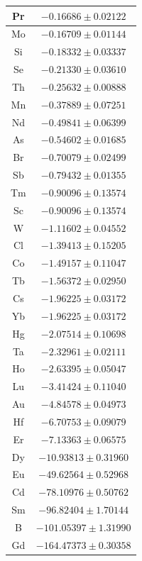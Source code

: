 \documentclass[11pt]{article}
\begin{document}
\begin{table}[ht]
\begin{tabular}{| c | c |}
    Pr                &   $-0.16686\pm0.02122$ \\ \hline
    Mo                &   $-0.16709\pm0.01144$ \\ \hline
    Si                &   $-0.18332\pm0.03337$ \\ \hline
    Se                &   $-0.21330\pm0.03610$ \\ \hline
    Th                &   $-0.25632\pm0.00888$ \\ \hline
    Mn                &   $-0.37889\pm0.07251$ \\ \hline
    Nd                &   $-0.49841\pm0.06399$ \\ \hline
    As                &   $-0.54602\pm0.01685$ \\ \hline
    Br                &   $-0.70079\pm0.02499$ \\ \hline
    Sb                &   $-0.79432\pm0.01355$ \\ \hline
    Tm                &   $-0.90096\pm0.13574$ \\ \hline
    Sc                &   $-0.90096\pm0.13574$ \\ \hline
    W                 &   $-1.11602\pm0.04552$ \\ \hline
    Cl                &   $-1.39413\pm0.15205$ \\ \hline
    Co                &   $-1.49157\pm0.11047$ \\ \hline
    Tb                &   $-1.56372\pm0.02950$ \\ \hline
    Cs                &   $-1.96225\pm0.03172$ \\ \hline
    Yb                &   $-1.96225\pm0.03172$ \\ \hline
    Hg                &   $-2.07514\pm0.10698$ \\ \hline
    Ta                &   $-2.32961\pm0.02111$ \\ \hline
    Ho                &   $-2.63395\pm0.05047$ \\ \hline
    Lu                &   $-3.41424\pm0.11040$ \\ \hline
    Au                &   $-4.84578\pm0.04973$ \\ \hline
    Hf                &   $-6.70753\pm0.09079$ \\ \hline
    Er                &   $-7.13363\pm0.06575$ \\ \hline
    Dy                &  $-10.93813\pm0.31960$ \\ \hline
    Eu                &  $-49.62564\pm0.52968$ \\ \hline
    Cd                &  $-78.10976\pm0.50762$ \\ \hline
    Sm                &  $-96.82404\pm1.70144$ \\ \hline
    B                 & $-101.05397\pm1.31990$ \\ \hline
    Gd                & $-164.47373\pm0.30358$ \\ \hline
    \end{tabular}
\end{table}
\end{document}
